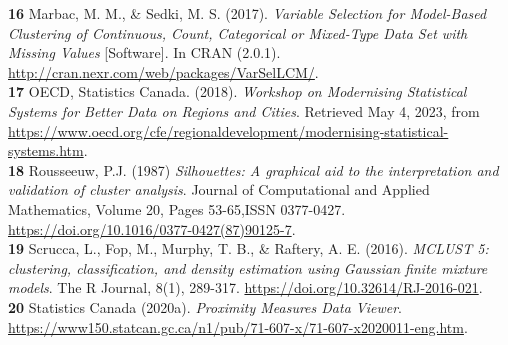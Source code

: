 \documentclass[11pt, a4paper]{article}
\begin{document}

\noindent\textbf{16} Marbac, M. M., \& Sedki, M. S. (2017). \textit{Variable Selection for Model-Based Clustering of Continuous, Count, Categorical or Mixed-Type Data Set with Missing Values} [Software]. In CRAN (2.0.1). \sloppy\url{ http://cran.nexr.com/web/packages/VarSelLCM/}. \\


\noindent\textbf{17} OECD, Statistics Canada. (2018). \textit{Workshop on Modernising Statistical Systems for Better Data on Regions and Cities}.  Retrieved May 4, 2023, from \sloppy\url{https://www.oecd.org/cfe/regionaldevelopment/modernising-statistical-systems.htm}. \\


\noindent\textbf{18} Rousseeuw, P.J. (1987) \textit{Silhouettes: A graphical aid to the interpretation and validation of cluster analysis}. Journal of Computational and Applied Mathematics, Volume 20, Pages 53-65,ISSN 0377-0427. \sloppy\url{https://doi.org/10.1016/0377-0427(87)90125-7}. \\

\noindent\textbf{19} Scrucca, L., Fop, M., Murphy, T. B., \& Raftery, A. E. (2016). \textit{MCLUST 5: clustering, classification, and density estimation using Gaussian finite mixture models}. The R Journal, 8(1), 289-317.  \sloppy\url{https://doi.org/10.32614/RJ-2016-021}. \\

\noindent\textbf{20} Statistics Canada (2020a). \textit{Proximity Measures Data Viewer}. \sloppy\url{https://www150.statcan.gc.ca/n1/pub/71-607-x/71-607-x2020011-eng.htm}. \\
\end{document}
